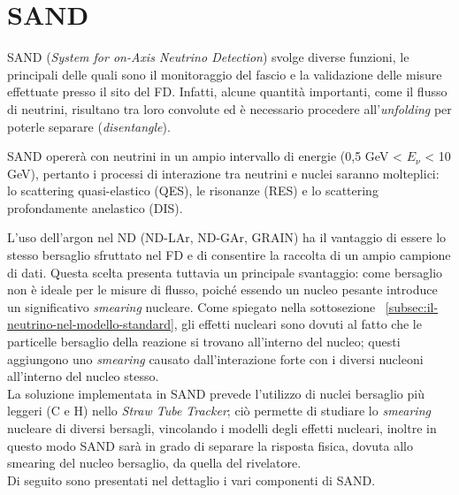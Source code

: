 \documentclass[../../main.tex]{subfiles}
\begin{document}
\section{SAND} \label{sec:sand}
  SAND (\textit{System for on-Axis Neutrino Detection}) svolge diverse
  funzioni, le principali delle quali sono il monitoraggio del fascio e la
  validazione delle misure effettuate presso il sito del FD\@.
  Infatti, alcune quantità importanti, come il flusso
  di neutrini, risultano tra loro convolute ed è necessario procedere
  all'\textit{unfolding} per poterle separare (\textit{disentangle}).

  SAND opererà con neutrini in un ampio intervallo di energie
  (0,5 GeV < $E_\nu$ < 10 GeV), pertanto i processi di interazione
  tra neutrini e nuclei saranno molteplici: lo scattering quasi-elastico (QES),
  le risonanze (RES) e lo scattering profondamente anelastico (DIS).

  L'uso dell'argon nel ND (ND-LAr, ND-GAr, GRAIN) ha il vantaggio di
  essere lo stesso bersaglio sfruttato nel FD e di consentire la raccolta di un
  ampio campione di dati.
  Questa scelta presenta tuttavia un principale svantaggio: come
  bersaglio non è ideale per le misure di flusso, poiché essendo un nucleo
  pesante introduce un significativo \textit{smearing} nucleare.
  Come spiegato nella sottosezione
  ~\ref{subsec:il-neutrino-nel-modello-standard}, gli effetti nucleari sono
  dovuti al fatto che le particelle bersaglio della reazione si trovano
  all'interno del nucleo; questi aggiungono uno \textit{smearing} causato
  dall'interazione forte con i diversi nucleoni all'interno del nucleo stesso.\\
  La soluzione implementata in SAND prevede l'utilizzo di nuclei
  bersaglio più leggeri (C e H) nello \textit{Straw Tube Tracker};
  ciò permette di studiare lo \textit{smearing} nucleare di diversi bersagli,
  vincolando i modelli degli effetti nucleari, inoltre in questo modo SAND
  sarà in grado di separare la risposta fisica, dovuta allo smearing del nucleo
  bersaglio, da quella del rivelatore.\\
  Di seguito sono presentati nel dettaglio i vari componenti di SAND\@.

  

  

  

  
\end{document}

